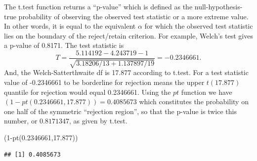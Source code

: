 \documentclass[
]{book}
\newenvironment{Shaded}{\begin{snugshade}}{\end{snugshade}}
\newcommand{\DecValTok}[1]{\textcolor[rgb]{0.00,0.00,0.81}{#1}}
\newcommand{\FloatTok}[1]{\textcolor[rgb]{0.00,0.00,0.81}{#1}}
\newcommand{\FunctionTok}[1]{\textcolor[rgb]{0.00,0.00,0.00}{#1}}
\newcommand{\NormalTok}[1]{#1}
\newcommand{\SpecialCharTok}[1]{\textcolor[rgb]{0.00,0.00,0.00}{#1}}
\begin{document}
The t.test function returns a ``p-value'' which is defined as the null-hypothesis-true probability of observing the observed test statistic or a more extreme value. In other words, it is equal to the equivalent \(\alpha\) for which the observed test statistic lies on the boundary of the reject/retain criterion. For example, Welch's test gives a p-value of 0.8171. The test statistic is
\[T = \frac{5.114192-4.243719-1}{\sqrt{3.18206/13 + 1.137897/19}}=-0.2346661.\]
And, the Welch-Satterthwaite df is 17.877 according to t.test. For a test statistic value of -0.2346661 to be borderline for rejection means the upper \(t(17.877)\) quantile for rejection would equal 0.2346661. Using the \(pt\) function we have \((1-pt(0.2346661,17.877)) = 0.4085673\) which constitutes the probability on one half of the symmetric ``rejection region'', so that the p-value is twice this number, or \(0.8171347\), as given by t.test.

\begin{Shaded}
\begin{Highlighting}[]
\NormalTok{(}\DecValTok{1}\SpecialCharTok{{-}}\FunctionTok{pt}\NormalTok{(}\FloatTok{0.2346661}\NormalTok{,}\FloatTok{17.877}\NormalTok{))}
\end{Highlighting}
\end{Shaded}

\begin{verbatim}
## [1] 0.4085673
\end{verbatim}

  
\end{document}
